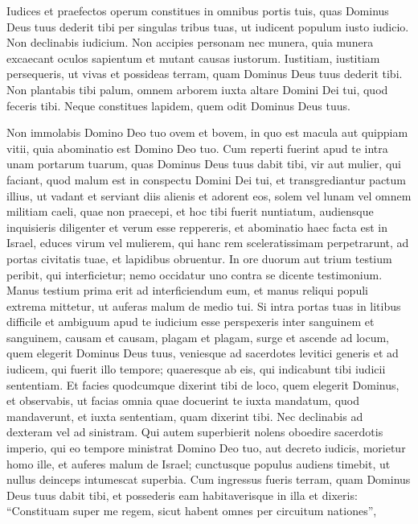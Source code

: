 \begin{biblechapter}
\begin{biblechapter}
\begin{biblechapter}
\begin{biblechapter}
\begin{biblechapter}
\begin{biblechapter}
\begin{biblechapter}
\begin{biblechapter}
\begin{biblechapter}
\begin{biblechapter}
\begin{biblechapter}
\begin{biblechapter}
\begin{biblechapter}
\begin{biblechapter}
\begin{biblechapter}
\begin{biblechapter}
 \verse Iudices et praefectos operum constitues in omnibus portis tuis, quas Dominus Deus tuus dederit tibi per singulas tribus tuas, ut iudicent populum iusto iudicio. 
\verse Non declinabis iudicium. Non accipies personam nec munera, quia munera excaecant oculos sapientum et mutant causas iustorum. 
\verse Iustitiam, iustitiam persequeris, ut vivas et possideas terram, quam Dominus Deus tuus dederit tibi.
 \verse Non plantabis tibi palum, omnem arborem iuxta altare Domini Dei tui, quod feceris tibi. 
\verse Neque constitues lapidem, quem odit Dominus Deus tuus.
 
\begin{biblechapter}
\verse Non immolabis Domino Deo tuo ovem et bovem, in quo est macula aut quippiam vitii, quia abominatio est Domino Deo tuo.
 \verse Cum reperti fuerint apud te intra unam portarum tuarum, quas Dominus Deus tuus dabit tibi, vir aut mulier, qui faciant, quod malum est in conspectu Domini Dei tui, et transgrediantur pactum illius, 
\verse ut vadant et serviant diis alienis et adorent eos, solem vel lunam vel omnem militiam caeli, quae non praecepi, 
 \verse et hoc tibi fuerit nuntiatum, audiensque inquisieris diligenter et verum esse reppereris, et abominatio haec facta est in Israel, 
\verse educes virum vel mulierem, qui hanc rem sceleratissimam perpetrarunt, ad portas civitatis tuae, et lapidibus obruentur. 
\verse In ore duorum aut trium testium peribit, qui interficietur; nemo occidatur uno contra se dicente testimonium. 
\verse Manus testium prima erit ad interficiendum eum, et manus reliqui populi extrema mittetur, ut auferas malum de medio tui.
 \verse Si intra portas tuas in litibus difficile et ambiguum apud te iudicium esse perspexeris inter sanguinem et sanguinem, causam et causam, plagam et plagam, surge et ascende ad locum, quem elegerit Dominus Deus tuus, 
\verse veniesque ad sacerdotes levitici generis et ad iudicem, qui fuerit illo tempore; quaeresque ab eis, qui indicabunt tibi iudicii sententiam. 
\verse Et facies quodcumque dixerint tibi de loco, quem elegerit Dominus, et observabis, ut facias omnia quae docuerint te 
\verse iuxta mandatum, quod mandaverunt, et iuxta sententiam, quam dixerint tibi. Nec declinabis ad dexteram vel ad sinistram. 
\verse Qui autem superbierit nolens oboedire sacerdotis imperio, qui eo tempore ministrat Domino Deo tuo, aut decreto iudicis, morietur homo ille, et auferes malum de Israel; 
\verse cunctusque populus audiens timebit, ut nullus deinceps intumescat superbia.
 \verse Cum ingressus fueris terram, quam Dominus Deus tuus dabit tibi, et possederis eam habitaverisque in illa et dixeris: “Constituam super me regem, sicut habent omnes per circuitum nationes”, 

\end{biblechapter}
\end{biblechapter}
\end{biblechapter}
\end{biblechapter}
\end{biblechapter}
\end{biblechapter}
\end{biblechapter}
\end{biblechapter}
\end{biblechapter}
\end{biblechapter}
\end{biblechapter}
\end{biblechapter}
\end{biblechapter}
\end{biblechapter}
\end{biblechapter}
\end{biblechapter}
\end{biblechapter}
